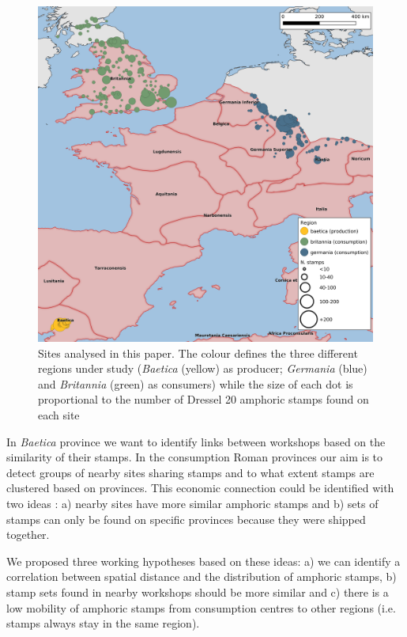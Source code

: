 \begin{figure}[htp]
	\centering
\includegraphics[width=\linewidth]{general_map}
\caption{Sites analysed in this paper. The colour defines the three different regions under study (\textit{Baetica} (yellow) as producer; \textit{Germania} (blue) and \textit{Britannia} (green) as consumers) while the size of each dot is proportional to the number of Dressel 20 amphoric stamps found on each site}

\label{general}
\end{figure} 
        
In \textit{Baetica} province we want to identify links between workshops based on the similarity of their stamps. In the consumption Roman provinces our aim is to detect groups of nearby sites sharing stamps and to what extent stamps are clustered based on provinces. This economic connection could be identified with two ideas : a) nearby sites have more similar amphoric stamps and b) sets of stamps can only be found on specific provinces because they were shipped together.


We proposed three working hypotheses based on these ideas: a) we can identify a correlation between spatial distance and the distribution of amphoric stamps, b) stamp sets found in nearby workshops should be more similar and c) there is a low mobility of amphoric stamps from consumption centres to other regions (i.e. stamps always stay in the same region).

